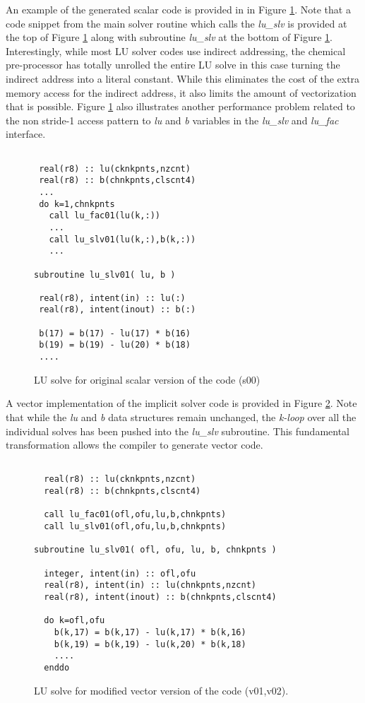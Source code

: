    An example of the generated scalar code is provided in in Figure \ref{fig:s00}.  Note that a code snippet from the main solver routine which calls the {\em lu\_slv} is provided at the top of Figure \ref{fig:s00} along with subroutine {\em lu\_slv} at the bottom of Figure \ref{fig:s00}.  Interestingly, while most LU solver codes use indirect addressing, the chemical pre-processor has totally unrolled the entire LU solve in this case turning the indirect address into a literal constant.  While this eliminates the cost of the extra memory access for the indirect address, it also limits the amount of vectorization that is possible.  Figure \ref{fig:s00} also illustrates another performance problem related to the non stride-1 access pattern to {\em lu} and {\em b} variables in the {\em lu\_slv} and {\em lu\_fac} interface.  

\begin{figure}
\begin{verbatim}

 real(r8) :: lu(cknkpnts,nzcnt)
 real(r8) :: b(chnkpnts,clscnt4)
 ...
 do k=1,chnkpnts
   call lu_fac01(lu(k,:))
   ...
   call lu_slv01(lu(k,:),b(k,:))
   ...
   
subroutine lu_slv01( lu, b )

 real(r8), intent(in) :: lu(:)
 real(r8), intent(inout) :: b(:)

 b(17) = b(17) - lu(17) * b(16)
 b(19) = b(19) - lu(20) * b(18)
 ....
\end{verbatim}
\caption{LU solve for original scalar version of the code (s00)}
\label{fig:s00}
\end{figure}

     A vector implementation of the implicit solver code is provided in Figure \ref{fig:chem-v01}.  Note that while the {\em lu} and {\em b} data structures remain unchanged, the {\em k-loop} over all the individual solves has been pushed into the {\em lu\_slv} subroutine.  This fundamental transformation allows the compiler to generate vector code.  

\begin{figure}
\begin{verbatim}

  real(r8) :: lu(cknkpnts,nzcnt)
  real(r8) :: b(chnkpnts,clscnt4)

  call lu_fac01(ofl,ofu,lu,b,chnkpnts)
  call lu_slv01(ofl,ofu,lu,b,chnkpnts)

subroutine lu_slv01( ofl, ofu, lu, b, chnkpnts )

  integer, intent(in) :: ofl,ofu
  real(r8), intent(in) :: lu(chnkpnts,nzcnt)
  real(r8), intent(inout) :: b(chnkpnts,clscnt4)

  do k=ofl,ofu
    b(k,17) = b(k,17) - lu(k,17) * b(k,16)
    b(k,19) = b(k,19) - lu(k,20) * b(k,18)
    ....
  enddo

\end{verbatim}
\caption{LU solve for modified vector version of the code (v01,v02).}
\label{fig:chem-v01}
\end{figure}



